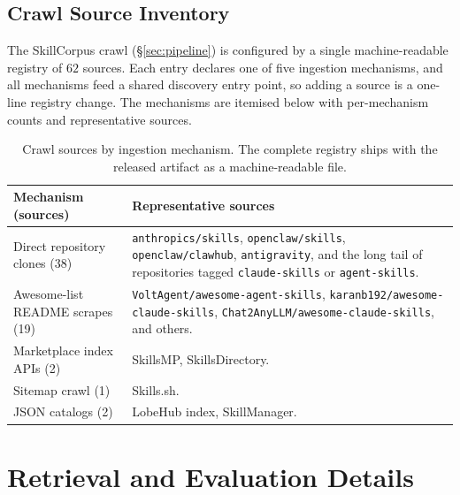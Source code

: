 \subsection{Crawl Source Inventory}
\label{app:crawl-sources}

The SkillCorpus crawl (\S\ref{sec:pipeline}) is configured by a
single machine-readable registry of $62$ sources.  Each entry
declares one of five ingestion mechanisms, and all mechanisms
feed a shared discovery entry point, so adding a source is a
one-line registry change.  The mechanisms are itemised below
with per-mechanism counts and representative sources.

\begin{table}[!ht]
\centering\scriptsize
\setlength{\tabcolsep}{4pt}
\begin{tabular}{@{}>{\raggedright\arraybackslash}p{}>{\raggedright\arraybackslash}p{}@{}}
\toprule
Mechanism (sources) & Representative sources \\
\midrule
Direct repository clones (38) &
\texttt{anthropics/skills}, \texttt{openclaw/skills},
\texttt{openclaw/clawhub}, \texttt{antigravity}, and the long
tail of repositories tagged \texttt{claude-skills} or
\texttt{agent-skills}. \\
\midrule
Awesome-list README scrapes (19) &
\texttt{VoltAgent/awesome-agent-skills},\newline
\texttt{karanb192/awesome-claude-skills},\newline
\texttt{Chat2AnyLLM/awesome-claude-skills}, and others. \\
\midrule
Marketplace index APIs (2) &
SkillsMP, SkillsDirectory. \\
\midrule
Sitemap crawl (1) &
Skills.sh. \\
\midrule
JSON catalogs (2) &
LobeHub index, SkillManager. \\
\bottomrule
\end{tabular}
\caption{Crawl sources by ingestion mechanism.  The complete
registry ships with the released artifact as a machine-readable
file.}
\label{tab:crawl-sources}
\end{table}

\section{Retrieval and Evaluation Details}
\label{app:eval-details}


